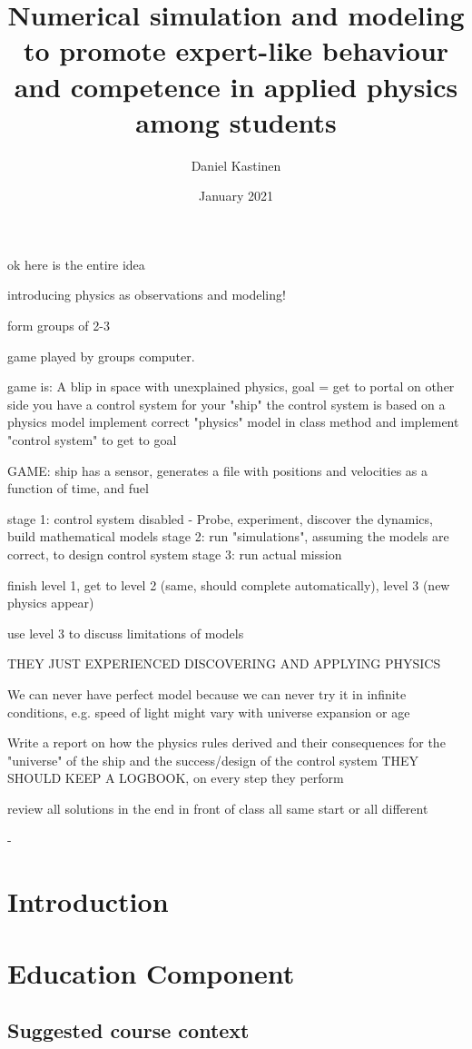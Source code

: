 \documentclass{article}
\title{Numerical simulation and modeling to promote expert-like behaviour and competence in applied physics among students}
\author{Daniel Kastinen}
\date{January 2021}
\begin{document}
\maketitle

ok here is the entire idea

introducing physics as observations and modeling!

form groups of 2-3

game played by groups computer.

game is:
A blip in space with unexplained physics, goal = get to portal on other side
you have a control system for your "ship"
the control system is based on a physics model
implement correct "physics" model in class method and implement "control system" to get to goal

GAME: ship has a sensor, generates a file with positions and velocities as a function of time, and fuel

stage 1: control system disabled - Probe, experiment, discover the dynamics, build mathematical models
stage 2: run "simulations", assuming the models are correct, to design control system
stage 3: run actual mission

finish level 1, get to level 2 (same, should complete automatically),
level 3 (new physics appear)

use level 3 to discuss limitations of models

THEY JUST EXPERIENCED DISCOVERING AND APPLYING PHYSICS

We can never have perfect model because we can never try it in infinite conditions, e.g. speed of light might vary with universe expansion or age

Write a report on how the physics rules derived and their consequences for the "universe" of the ship and the success/design of the control system
THEY SHOULD KEEP A LOGBOOK, on every step they perform

review all solutions in the end in front of class
all same start or all different


- 

\section{Introduction}

\section{Education Component}

\subsection{Suggested course context}
\end{document}
